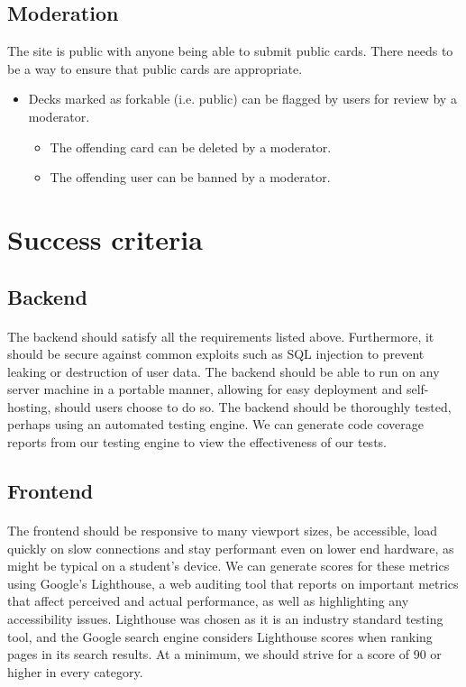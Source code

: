 \documentclass{report}
\begin{document}
\subsection{Moderation}
The site is public with anyone being able to submit public cards. There needs to be a way to ensure that public cards are appropriate.

\begin{itemize}
  \item Decks marked as forkable (i.e. public) can be flagged by users for review by a moderator.
  \begin{itemize}
    \item The offending card can be deleted by a moderator.
    \item The offending user can be banned by a moderator.
  \end{itemize} 
\end{itemize}

\section{Success criteria}
\subsection{Backend}
\paragraph{}
The backend should satisfy all the requirements listed above. Furthermore, it should be secure against common exploits such as SQL injection to prevent leaking or destruction of user data. The backend should be able to run on any server machine in a portable manner, allowing for easy deployment and self-hosting, should users choose to do so. The backend should be thoroughly tested, perhaps using an automated testing engine. We can generate code coverage reports from our testing engine to view the effectiveness of our tests.

\subsection{Frontend}
\paragraph{}
The frontend should be responsive to many viewport sizes, be accessible, load quickly on slow connections and stay performant even on lower end hardware, as might be typical on a student's device. We can generate scores for these metrics using Google's Lighthouse, a web auditing tool that reports on important metrics that affect perceived and actual performance, as well as highlighting any accessibility issues. Lighthouse was chosen as it is an industry standard testing tool, and the Google search engine considers Lighthouse scores when ranking pages in its search results. At a minimum, we should strive for a score of 90 or higher in every category.
\end{document}

